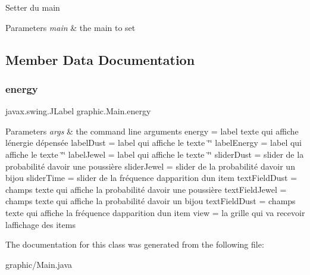 Setter du main 
\begin{DoxyParams}{Parameters}
{\em main} & the main to set \\
\hline
\end{DoxyParams}


\subsection{Member Data Documentation}
\hypertarget{classgraphic_1_1_main_a07b285e66d82f1f90d94a7c61ad939a1}{}\label{classgraphic_1_1_main_a07b285e66d82f1f90d94a7c61ad939a1} 
\subsubsection{\texorpdfstring{energy}{energy}}
{\footnotesize\ttfamily javax.\+swing.\+J\+Label graphic.\+Main.\+energy}


\begin{DoxyParams}{Parameters}
{\em args} & the command line arguments energy = label texte qui affiche l\textquotesingle{}énergie dépensée label\+Dust = label qui affiche le texte \char`\"{}\char`\"{} label\+Energy = label qui affiche le texte \char`\"{}\char`\"{} label\+Jewel = label qui affiche le texte \char`\"{}\char`\"{} slider\+Dust = slider de la probabilité d\textquotesingle{}avoir une poussière slider\+Jewel = slider de la probabilité d\textquotesingle{}avoir un bijou slider\+Time = slider de la fréquence d\textquotesingle{}apparition d\textquotesingle{}un item text\+Field\+Dust = champs texte qui affiche la probabilité d\textquotesingle{}avoir une poussière text\+Field\+Jewel = champs texte qui affiche la probabilité d\textquotesingle{}avoir un bijou text\+Field\+Dust = champs texte qui affiche la fréquence d\textquotesingle{}apparition d\textquotesingle{}un item view = la grille qui va recevoir l\textquotesingle{}affichage des items \\
\hline
\end{DoxyParams}


The documentation for this class was generated from the following file\+:\begin{DoxyCompactItemize}
\item 
graphic/Main.\+java\end{DoxyCompactItemize}
